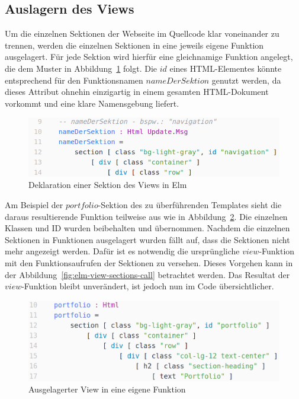 \subsection{Auslagern des Views}
\label{sec:auslagern-des-views}
Um die einzelnen Sektionen der Webseite im Quellcode klar voneinander zu trennen, werden die einzelnen Sektionen in eine jeweils eigene Funktion ausgelagert.
Für jede Sektion wird hierfür eine gleichnamige Funktion angelegt, die dem Muster in Abbildung~\ref{fig:elm-view-section} folgt. Die $id$ eines \ac{HTML}-Elementes könnte entsprechend für den Funktionsnamen $nameDerSektion$ genutzt werden, da dieses Attribut ohnehin einzigartig in einem gesamten \ac{HTML}-Dokument vorkommt und eine klare Namensgebung liefert.
\begin{figure}[htb]
\centering
\includegraphics[scale=0.53]{img/elm-html-sections.png}
\caption{Deklaration einer Sektion des Views in Elm}\label{fig:elm-view-section}
\end{figure}
Am Beispiel der $portfolio$-Sektion des zu überführenden Templates sieht die daraus resultierende Funktion teilweise aus wie in Abbildung~\ref{fig:elm-view-section-function}. Die einzelnen Klassen und \ac{ID} wurden beibehalten und übernommen. Nachdem die einzelnen Sektionen in Funktionen ausgelagert wurden fällt auf, dass die Sektionen nicht mehr angezeigt werden. Dafür ist es notwendig die ursprüngliche $view$-Funktion mit den Funktionsaufrufen der Sektionen zu versehen. Dieses Vorgehen kann in der Abbildung~\ref{fig:elm-view-sections-call} betrachtet werden. Das Resultat der $view$-Funktion bleibt unverändert, ist jedoch nun im Code übersichtlicher.
\begin{figure}[h]
\centering
\includegraphics[scale=0.41]{img/elm-view-portfolio-section-function.png}
\caption{Ausgelagerter View in eine eigene Funktion}\label{fig:elm-view-section-function}
\end{figure}


